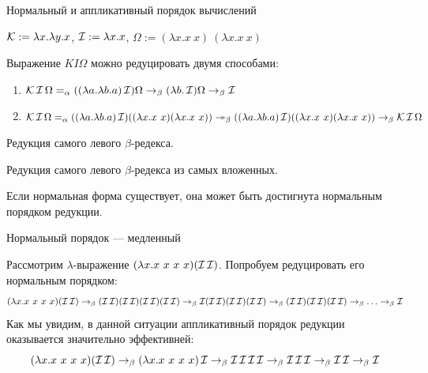 \documentclass[aspectratio=169]{beamer}
\begin{document}
\begin{frame}{Нормальный и аппликативный порядок вычислений}

\begin{exm}
$\operatorname{\mathcal{K}} := \lambda x.\lambda y.x$, $\operatorname{\mathcal{I}} := \lambda x.x$, $\Omega := (\lambda x.x\ x)\ (\lambda x.x\ x)$

	Выражение $KI\Omega$ можно редуцировать двумя способами:
	\begin{enumerate}
		\item $\operatorname{\mathcal{K}} \operatorname{\mathcal{I}} \Omega =_{\alpha} ((\lambda{}a.\lambda{}b.a) \operatorname{\mathcal{I}}) \Omega \to_{\beta} (\lambda{}b.\operatorname{\mathcal{I}})\Omega  \to_{\beta} \operatorname{\mathcal{I}}$
		\item  $\comb K \comb I \Omega =_{\alpha} ((\lambda{}a.\lambda{}b.a) \comb I)((\lambda{}x.x \ x) (\lambda{}x.x \ x)) \twoheadrightarrow_{\beta} ((\lambda{}a.\lambda{}b.a) \comb I)((\lambda{}x.x \ x) (\lambda{}x.x \ x)) \to_{\beta} \comb K \comb I \Omega $
	\end{enumerate}
\end{exm}


\begin{dfn}
	Редукция самого левого $\beta$-редекса.
\end{dfn}

\begin{dfn}
	Редукция самого левого $\beta$-редекса из самых вложенных.
\end{dfn}

\begin{thm}
	Если нормальная форма существует, она может быть достигнута нормальным порядком редукции.
\end{thm}
\end{frame}

\begin{frame}{Нормальный порядок --- медленный}

\begin{exm}
	Рассмотрим $\lambda$-выражение $(\lambda{}x.x \ x \ x \ x) (\operatorname{\mathcal{I}} \operatorname{\mathcal{I}})$. Попробуем редуцировать его нормальным порядком:
	 \[(\lambda{}x.x \ x \ x \ x) (\operatorname{\mathcal{I}} \operatorname{\mathcal{I}}) \to_{\beta} (\operatorname{\mathcal{I}} \operatorname{\mathcal{I}})(\operatorname{\mathcal{I}} \operatorname{\mathcal{I}})(\operatorname{\mathcal{I}} \operatorname{\mathcal{I}})(\operatorname{\mathcal{I}} \operatorname{\mathcal{I}}) \to_{\beta} \operatorname{\mathcal{I}}(\operatorname{\mathcal{I}} \operatorname{\mathcal{I}})(\operatorname{\mathcal{I}} \operatorname{\mathcal{I}})(\operatorname{\mathcal{I}} \operatorname{\mathcal{I}}) \to_{\beta} (\operatorname{\mathcal{I}} \operatorname{\mathcal{I}})(\operatorname{\mathcal{I}} \operatorname{\mathcal{I}})(\operatorname{\mathcal{I}} \operatorname{\mathcal{I}}) \to_{\beta} \ldots \to_{\beta} \operatorname{\mathcal{I}}\] 
	Как мы увидим, в данной ситуации аппликативный порядок редукции оказывается значительно эффективней: 
	\[ (\lambda{}x.x \ x \ x \ x) (\operatorname{\mathcal{I}} \operatorname{\mathcal{I}}) \to_{\beta} (\lambda{}x.x \ x \ x \ x) \operatorname{\mathcal{I}} \to_{\beta} \operatorname{\mathcal{I}} \operatorname{\mathcal{I}} \operatorname{\mathcal{I}} \operatorname{\mathcal{I}}\to_{\beta} \operatorname{\mathcal{I}} \operatorname{\mathcal{I}} \operatorname{\mathcal{I}} \to_{\beta} \operatorname{\mathcal{I}} \operatorname{\mathcal{I}} \to_{\beta} \operatorname{\mathcal{I}} \]
\end{exm}
\end{frame}
\end{document}
